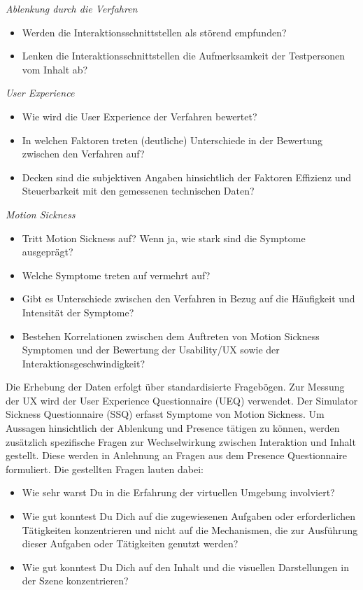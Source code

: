 \textit{Ablenkung durch die Verfahren}
\begin{itemize}
    \item Werden die Interaktionsschnittstellen als störend empfunden?
    \item Lenken die Interaktionsschnittstellen die Aufmerksamkeit der Testpersonen vom Inhalt ab?
\end{itemize}
\textit{User Experience}
\begin{itemize}
    \item Wie wird die User Experience der Verfahren bewertet?
    \item In welchen Faktoren treten (deutliche) Unterschiede in der Bewertung zwischen den Verfahren auf? 
    \item Decken sind die subjektiven Angaben hinsichtlich der Faktoren Effizienz und Steuerbarkeit mit den gemessenen technischen Daten?
\end{itemize}
\textit{Motion Sickness}
\begin{itemize}
    \item Tritt Motion Sickness auf? Wenn ja, wie stark sind die Symptome ausgeprägt?
    \item Welche Symptome treten auf vermehrt auf?
    \item Gibt es Unterschiede zwischen den Verfahren in Bezug auf die Häufigkeit und Intensität der Symptome?
    \item Bestehen Korrelationen zwischen dem Auftreten von Motion Sickness Symptomen und der Bewertung der Usability/UX sowie der Interaktionsgeschwindigkeit? 
\end{itemize}

Die Erhebung der Daten erfolgt über standardisierte Fragebögen. Zur Messung der UX wird der User Experience Questionnaire (UEQ) verwendet. Der Simulator Sickness Questionnaire (SSQ) erfasst Symptome von Motion Sickness. Um Aussagen hinsichtlich der Ablenkung und Presence tätigen zu können, werden zusätzlich spezifische Fragen zur Wechselwirkung zwischen Interaktion und Inhalt gestellt. Diese werden in Anlehnung an Fragen aus dem Presence Questionnaire formuliert. Die gestellten Fragen lauten dabei:

\begin{itemize}
    \item Wie sehr warst Du in die Erfahrung der virtuellen Umgebung involviert?
    \item Wie gut konntest Du Dich auf die zugewiesenen Aufgaben oder erforderlichen Tätigkeiten konzentrieren und nicht auf die Mechanismen, die zur Ausführung dieser Aufgaben oder Tätigkeiten genutzt werden?
    \item Wie gut konntest Du Dich auf den Inhalt und die visuellen Darstellungen in der Szene konzentrieren?
\end{itemize}

